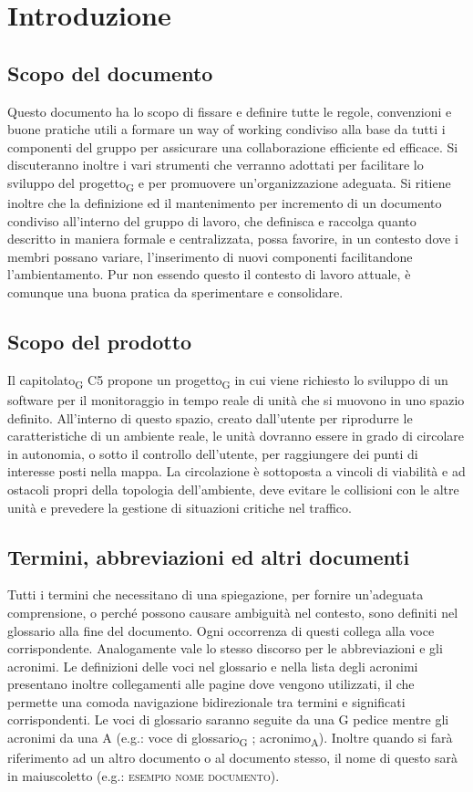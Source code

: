 \section{Introduzione}
\subsection{Scopo del documento}
    Questo documento ha lo scopo di fissare e definire tutte le regole, convenzioni e buone pratiche utili a formare un way of working condiviso alla base da tutti i componenti del gruppo per assicurare una collaborazione efficiente ed efficace. Si discuteranno inoltre i vari strumenti che verranno adottati per facilitare lo sviluppo del progetto\textsubscript{G} e per promuovere un'organizzazione adeguata.
    Si ritiene inoltre che la definizione ed il mantenimento per incremento di un documento condiviso all'interno del gruppo di lavoro, che definisca e raccolga quanto descritto in maniera formale e centralizzata, possa favorire, in un contesto dove i membri possano variare, l'inserimento di nuovi componenti facilitandone l'ambientamento. Pur non essendo questo il contesto di lavoro attuale, è comunque una buona pratica da sperimentare e consolidare.

\subsection{Scopo del prodotto}
Il capitolato\textsubscript{G} C5 propone un progetto\textsubscript{G} in cui viene richiesto lo sviluppo di un software per il monitoraggio in tempo reale di unità che si muovono in uno spazio definito. All'interno di questo spazio, creato dall'utente per riprodurre le caratteristiche di un ambiente reale, le unità dovranno essere in grado di circolare in autonomia, o sotto il controllo dell'utente, per raggiungere dei punti di interesse posti nella mappa.  La circolazione è sottoposta a vincoli di viabilità e ad ostacoli propri della topologia dell'ambiente, deve evitare le collisioni con le altre unità e prevedere la gestione di situazioni critiche nel traffico.

\subsection{Termini, abbreviazioni ed altri documenti}
    Tutti i termini che necessitano di una spiegazione, per fornire un'adeguata comprensione, o perché possono causare ambiguità nel contesto, sono definiti nel glossario alla fine del documento. Ogni occorrenza di questi collega alla voce corrispondente. Analogamente vale lo stesso discorso per le abbreviazioni e gli acronimi. Le definizioni delle voci nel glossario e nella lista degli acronimi presentano inoltre collegamenti alle pagine dove vengono utilizzati, il che permette una comoda navigazione bidirezionale tra termini e significati corrispondenti. Le voci di glossario saranno seguite da una G pedice mentre gli acronimi da una A (e.g.: voce di glossario\textsubscript{G} ; acronimo\textsubscript{A}).
    Inoltre quando si farà riferimento ad un altro documento o al documento stesso, il nome di questo sarà in maiuscoletto (e.g.: \textsc{esempio nome documento}).

